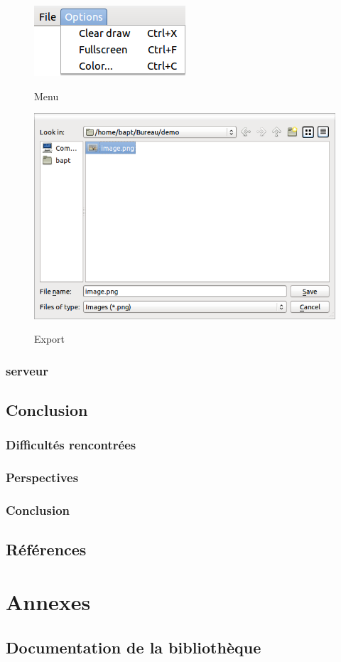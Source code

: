 \documentclass{report}
\begin{document}
				\begin{figure}[!h]
						\centering
						\includegraphics[scale=0.4]{../images/menu.png}\\
						\caption{Menu}
						\label{Menu}
				\end{figure}
				\begin{figure}[!h]
						\centering
						\includegraphics[scale=0.4]{../images/export.png}\\
						\caption{Export}
						\label{Export}
				\end{figure}
				\newpage
		\section{serveur}
		
	
	\chapter{Conclusion}
		\section{Difficultés rencontrées}
		\section{Perspectives}
		\section{Conclusion}
	
	\chapter{Références}
	
	\part{Annexes}
	\appendix
		\chapter{Documentation de la bibliothèque}
\end{document}
